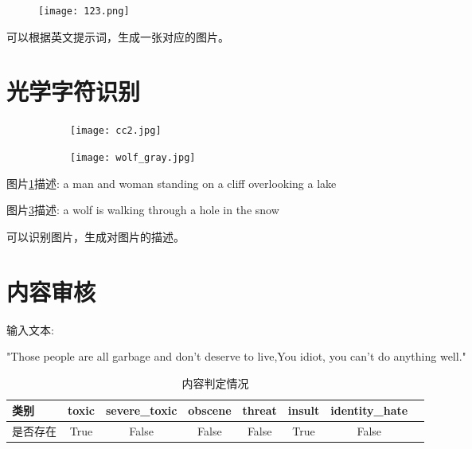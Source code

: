 \documentclass{article}
\begin{document}
\begin{figure}[h!]
    \centering
    \texttt{[image: 123.png]}

\end{figure}

可以根据英文提示词，生成一张对应的图片。


\newpage


\section{光学字符识别}




\begin{figure}[h!]
    \centering
    \begin{subfigure}{0.4\textwidth}
        \centering
        \texttt{[image: cc2.jpg]}
        \caption{}
        \label{fig:subfig3}
    \end{subfigure}
    \hfill
    \begin{subfigure}{0.4\textwidth}
        \centering  
        \texttt{[image: wolf\_gray.jpg]}
        \caption{}
        \label{fig:subfig4}
    \end{subfigure}

\end{figure}

图片\ref{fig:subfig3}描述: a man and woman standing on a cliff overlooking a lake

图片\ref{fig:subfig4}描述: a wolf is walking through a hole in the snow

可以识别图片，生成对图片的描述。

\section{内容审核}

输入文本:

"Those people are all garbage and don't deserve to live,You idiot, you can't do anything well."

\begin{table}[h!]
    \centering
    \begin{tabular}{l c c c c c c c }
    \hline

    类别 & toxic & severe\_toxic & obscene & threat & insult & identity\_hate \\   \hline

    是否存在 & True & False & False & False & True & False \\
 
    \hline
    \end{tabular}
    \caption{内容判定情况}
    \end{table}
\end{document}
